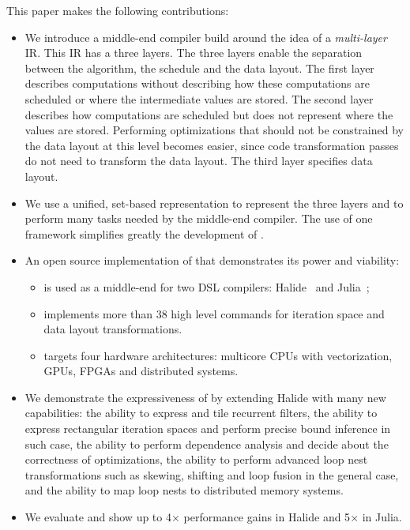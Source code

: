 This paper makes the following contributions:
\begin{itemize}
  \item We introduce a middle-end compiler build around the idea of a \emph{multi-layer} IR. This IR has a three layers.  The  three layers enable the separation between the algorithm, the schedule and the data layout. The first layer describes computations without describing how these computations are scheduled or where the intermediate values are stored.  The second layer describes how computations are scheduled but does not represent where the values are stored.  Performing optimizations that should not be constrained by the data layout at this level becomes easier, since code transformation passes do not need to transform the data layout. The third layer specifies data layout.
  \item We use a unified, set-based representation to represent the three layers and to perform many tasks needed by the \framework{} middle-end compiler.  The use of one framework simplifies greatly the development of \framework{}.
  \item An open source implementation of \framework{} that demonstrates its power and viability:
  \begin{itemize}
    \item \framework{} is used as a middle-end for two DSL compilers: Halide~\cite{halide_12,DBLP:conf/pldi/Ragan-KelleyBAPDA13} and Julia~\cite{bezanson2017julia};
    \item \framework{} implements more than 38 high level  commands for iteration space and data layout transformations.
    \item \framework{} targets four hardware architectures: multicore CPUs with vectorization, GPUs, FPGAs and distributed systems.
  \end{itemize}
  \item We demonstrate the expressiveness of \framework{} by  extending Halide with many new capabilities: the ability to express and tile recurrent filters, the ability to express rectangular iteration spaces and perform precise bound inference in such case, the ability to perform dependence analysis and decide about the correctness of optimizations, the ability to perform advanced loop nest transformations such as skewing, shifting and loop fusion in the general case, and the ability to map loop nests to distributed memory systems.
  \item We evaluate \framework{} and show up to 4$\times$ performance gains in Halide and 5$\times$ in Julia.
\end{itemize}
